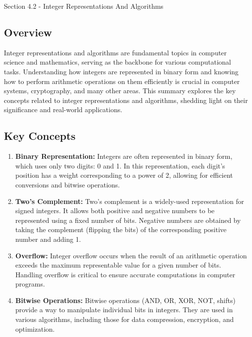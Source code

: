 \begin{notes}{Section 4.2 - Integer Representations And Algorithms}
    \subsection*{Overview}

    Integer representations and algorithms are fundamental topics in computer science and mathematics, serving as the backbone for various computational tasks. Understanding how integers are represented 
    in binary form and knowing how to perform arithmetic operations on them efficiently is crucial in computer systems, cryptography, and many other areas. This summary explores the key concepts related 
    to integer representations and algorithms, shedding light on their significance and real-world applications.

    \subsection*{Key Concepts}

    \begin{enumerate}[label=\arabic*.]
        \item \textbf{Binary Representation:} Integers are often represented in binary form, which uses only two digits: 0 and 1. In this representation, each digit's position has a weight corresponding 
        to a power of 2, allowing for efficient conversions and bitwise operations.
        
        \item \textbf{Two's Complement:} Two's complement is a widely-used representation for signed integers. It allows both positive and negative numbers to be represented using a fixed number of bits. 
        Negative numbers are obtained by taking the complement (flipping the bits) of the corresponding positive number and adding 1.
        
        \item \textbf{Overflow:} Integer overflow occurs when the result of an arithmetic operation exceeds the maximum representable value for a given number of bits. Handling overflow is critical to 
        ensure accurate computations in computer programs.
        
        \item \textbf{Bitwise Operations:} Bitwise operations (AND, OR, XOR, NOT, shifts) provide a way to manipulate individual bits in integers. They are used in various algorithms, including those 
        for data compression, encryption, and optimization.
        

\end{enumerate}
\end{notes}
